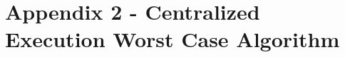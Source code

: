 \documentclass[letterpaper]{article} %
\newcommand{\unknown}{\textit{b}|\textit{u}}
\newcommand{\tuple}[1]{\ensuremath{\left \langle #1 \right \rangle }}
\newcommand{\roni}[1]{{\textcolor{green}{[Roni: #1]}}}
\newtheorem{observation}{Observation}
\begin{document}


\section{Appendix 2 - Centralized Execution Worst Case Algorithm}
\end{document}
